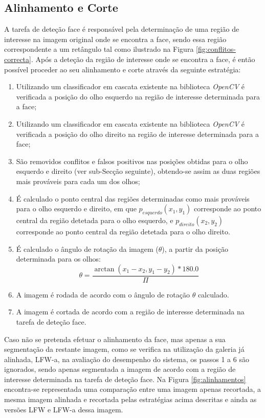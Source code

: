 \subsection{Alinhamento e Corte} \label{sec:alinhamentoEcorte}
A tarefa de deteção face é responsável pela determinação de uma região de interesse na imagem original onde se encontra a face, sendo essa região correspondente a um retângulo tal como ilustrado na Figura \ref{fig:conflitos-correcta}. Após a deteção da região de interesse onde se encontra a face, é então possível proceder ao seu alinhamento e corte através da seguinte estratégia:

\begin{enumerate}
\item Utilizando um classificador em cascata existente na biblioteca \textit{OpenCV} é verificada a posição do olho esquerdo na região de interesse determinada para a face;
\item Utilizando um classificador em cascata existente na biblioteca \textit{OpenCV} é verificada a posição do olho direito na região de interesse determinada para a face;
\item São removidos conflitos e falsos positivos nas posições obtidas para o olho esquerdo e direito (ver sub-Secção seguinte), obtendo-se assim as duas regiões mais prováveis para cada um dos olhos;
\item É calculado o ponto central das regiões determinadas como mais prováveis para o olho esquerdo e direito, em que $p_{esquerdo}(x_1,y_1)$ corresponde ao ponto central da região detetada para o olho esquerdo, e  $p_{direito}(x_2,y_2)$ corresponde ao ponto central da região detetada para o olho direito.
\item É calculado o ângulo de rotação da imagem ($\theta$), a partir da posição determinada para os olhos:
\begin{equation}
\theta = \frac{\arctan(x_1 - x_2, y_1 - y_2) * 180.0}{\Pi}
\end{equation}
\item A imagem é rodada de acordo com o ângulo de rotação $\theta$ calculado.
\item A imagem é cortada de acordo com a região de interesse determinada na tarefa de deteção face.
\end{enumerate}

Caso não se pretenda efetuar o alinhamento da face, mas apenas a sua segmentação da restante imagem, como se verifica na utilização da galeria já alinhada, LFW-a, na avaliação do desempenho do sistema, os passos 1 a 6 são ignorados, sendo apenas segmentada a imagem de acordo com a região de interesse determinada na tarefa de deteção face. Na Figura \ref{fig:alinhamentos} encontra-se representada uma comparação entre uma imagem apenas recortada, a mesma imagem alinhada e recortada pelas estratégias acima descritas e ainda as versões LFW e LFW-a dessa imagem.

